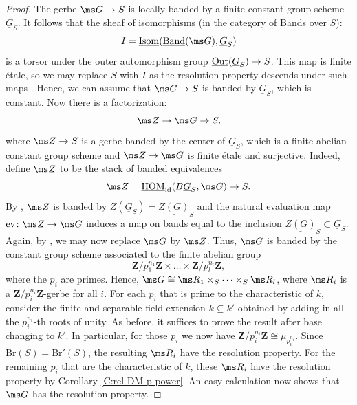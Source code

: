 \documentclass[reqno,a4paper]{amsart}
\numberwithin{Theorem}{section}
\theoremstyle{plain}
\theoremstyle{remark}
\newcommand{\classB}{B}
\begin{document}
\begin{proof}
  The gerbe $\ms G \to S$ is locally banded by a finite constant group scheme
  $\underline{G}_S$. It follows that the sheaf of isomorphisms (in the
  category of Bands over $S$):
  \[
    I=\underline{\mathrm{Isom}}(\underline{\mathrm{Band}}(\ms G),\underline{G}_S)
  \]
  is a torsor under the outer automorphism group
  $\text{\underline{Out}}(\underline{G}_S) \to S$. This map is finite
  \'etale, so we may replace $S$ with $I$ as the resolution property
  descends under such maps
  \cite[Prop. 5.3(vii)]{2013arXiv1306.5418G}. Hence, we can assume
  that $\ms G \to S$ is banded by $\underline{G}_S$, which is constant.
  Now there is a factorization:
  \[
    \ms Z \to \ms G \to S,
  \]
  where $\ms Z \to S$ is a gerbe banded by the center of
  $\underline{G}_S$, which is a finite abelian constant group scheme
  and $\ms Z \to \ms G$ is finite \'etale and surjective. Indeed,
  define $\ms Z$ to be the stack of banded equivalences
  \[
    \ms Z=\underline{\mathrm{HOM}}_{\mathrm{id}}(\classB\underline{G}_S, \ms G) \to S.
  \]
  By \cite[IV.2.3.2(iii)]{giraud1966cohomologie}, $\ms Z$ is banded by
  $Z(\underline{G}_S)=\underline{Z(G)}_S$ and the natural evaluation
  map $\text{ev} \colon \ms Z \to \ms G$ induces a map on bands equal
  to the inclusion $\underline{Z(G)}_S \subset
  \underline{G}_S$. Again, by
  \cite[Prop. 5.3(vii)]{2013arXiv1306.5418G}, we may now replace
  $\ms G$ by $\ms Z$. Thus, $\ms G$ is banded by the constant group
  scheme associated to the finite abelian group
  \[
    \mathbf{Z}/p_1^{n_1}\mathbf{Z} \times \dots \times \mathbf{Z}/p_l^{n_l}\mathbf{Z},
  \]
  where the $p_i$ are primes. Hence,
  $\ms G \cong \ms R_1 \times_S \dots \times_S \ms R_l$, where
  $\ms R_i$ is a $\mathbf{Z}/p_i^{n_i}\mathbf{Z}$-gerbe for all
  $i$. For each $p_i$ that is prime to the characteristic of $k$,
  consider the finite and separable field extension $k \subseteq k'$
  obtained by adding in all the $p_i^{n_i}$-th roots of unity. As
  before, it suffices to prove the result after base changing to
  $k'$. In particular, for those $p_i$ we now have
  $\mathbf{Z}/p_i^{n_i}\mathbf{Z} \cong \mu_{p_i^{n_i}}$. Since
  $\mathrm{Br}(S)=\mathrm{Br}'(S)$, the resulting $\ms R_i$ have the
  resolution property. For the remaining $p_i$ that are the
  characteristic of $k$, these $\ms R_i$ have the resolution property
  by Corollary \ref{C:rel-DM-p-power}. An easy calculation now shows
  that $\ms G$ has the resolution property.
\end{proof}
\end{document}

